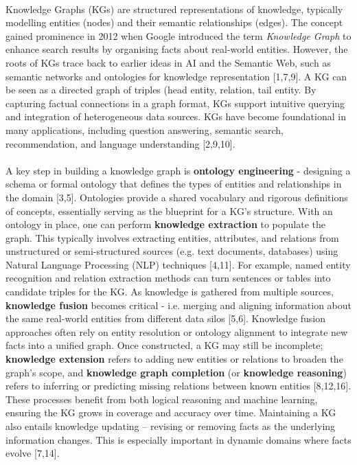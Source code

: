         \paragraph{} Knowledge Graphs (KGs) are structured representations of knowledge, typically modelling entities (nodes) and their semantic relationships (edges). The concept gained prominence in 2012 when Google introduced the term \textit{Knowledge Graph} to enhance search results by organising facts about real-world entities. However, the roots of KGs trace back to earlier ideas in AI and the Semantic Web, such as semantic networks and ontologies for knowledge representation [1,7,9]. A KG can be seen as a directed graph of triples (head entity, relation, tail entity. By capturing factual connections in a graph format, KGs support intuitive querying and integration of heterogeneous data sources. KGs have become foundational in many applications, including question answering, semantic search, recommendation, and language understanding [2,9,10].

        \paragraph{} A key step in building a knowledge graph is \textbf{ontology engineering} - designing a schema or formal ontology that defines the types of entities and relationships in the domain [3,5]. Ontologies provide a shared vocabulary and rigorous definitions of concepts, essentially serving as the blueprint for a KG’s structure. With an ontology in place, one can perform \textbf{knowledge extraction} to populate the graph. This typically involves extracting entities, attributes, and relations from unstructured or semi-structured sources (e.g. text documents, databases) using Natural Language Processing (NLP) techniques [4,11]. For example, named entity recognition and relation extraction methods can turn sentences or tables into candidate triples for the KG. As knowledge is gathered from multiple sources, \textbf{knowledge fusion} becomes critical - i.e. merging and aligning information about the same real-world entities from different data silos [5,6]. Knowledge fusion approaches often rely on entity resolution or ontology alignment to integrate new facts into a unified graph. Once constructed, a KG may still be incomplete; \textbf{knowledge extension} refers to adding new entities or relations to broaden the graph’s scope, and \textbf{knowledge graph completion} (or \textbf{knowledge reasoning}) refers to inferring or predicting missing relations between known entities [8,12,16]. These processes benefit from both logical reasoning and machine learning, ensuring the KG grows in coverage and accuracy over time. Maintaining a KG also entails knowledge updating – revising or removing facts as the underlying information changes. This is especially important in dynamic domains where facts evolve [7,14].

